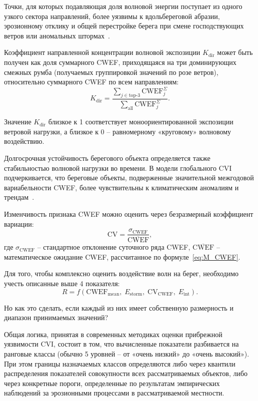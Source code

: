 Точки, для которых подавляющая доля волновой энергии поступает из одного узкого сектора направлений, более уязвимы к вдольбереговой абразии, эрозионному отклику и общей перестройке берега при смене господствующих ветров или аномальных штормах~\cite{Harley2017, Basnayake2026GlobalCoastalVulnerability}. 

Коэффициент направленной концентрации волновой экспозиции $K_\text{dir}$ может быть получен как доля суммарного CWEF, приходящаяся на три доминирующих смежных румба (получаемых группировкой значений по розе ветров), относительно суммарного CWEF по всем направлениям:
\begin{equation}
    K_\text{dir} = \frac{\sum_{j \in \text{top-3}} \text{CWEF}_j^{\Sigma}}{\sum_{\text{all}} \text{CWEF}_j^{\Sigma}}.
\end{equation}

Значение $K_\text{dir}$ близкое к 1 соответствует моноориентированной экспозиции ветровой нагрузки, а близкое к 0 -- равномерному «круговому» волновому воздействию.

Долгосрочная устойчивость берегового объекта определяется также стабильностью волновой нагрузки во времени.
В модели глобального CVI~\cite{Guannel2022USVI_CVI, Basnayake2026GlobalCVI} подчеркивается, что береговые объекты, подверженные значительной межгодовой вариабельности CWEF, более чувствительны к климатическим аномалиям и трендам~\cite{Ghanavati2023_wave_surge_coastlines}. 

Изменчивость признака CWEF можно оценить через безразмерный коэффициент вариации:
\begin{equation}
    \text{CV} = \frac{\sigma_\text{CWEF}}{\overline{\text{CWEF}}},
\end{equation}
где $\sigma_\text{CWEF}$ -- стандартное отклонение суточного ряда CWEF, $\overline{\text{CWEF}}$ -- математическое ожидание CWEF, рассчитанное по формуле~\eqref{eq:M_CWEF}.

Для того, чтобы комплексно оценить воздействие волн на берег, необходимо учесть описанные выше 4 показателя:
\begin{equation}
    R = f\!\left(\text{CWEF}_\text{mean},\; E_\text{storm},\; \text{CV}_\text{CWEF},\; E_\text{int}\right).
\end{equation}

Но как это сделать, если каждый из них имеет собственную размерность и диапазон принимаемых значений?

Общая логика, принятая в современных методиках оценки прибрежной уязвимости CVI, состоит в том, что вычисленные показатели разбивается на ранговые классы (обычно 5 уровней -- от «очень низкий» до «очень высокий»).
При этом границы назначаемых классов определяются либо через квантили распределения показателей совокупности всех рассматриваемых объектов, либо через конкретные пороги, определенные по результатам эмпирических наблюдений за эрозионными процессами в рассматриваемой местности.

